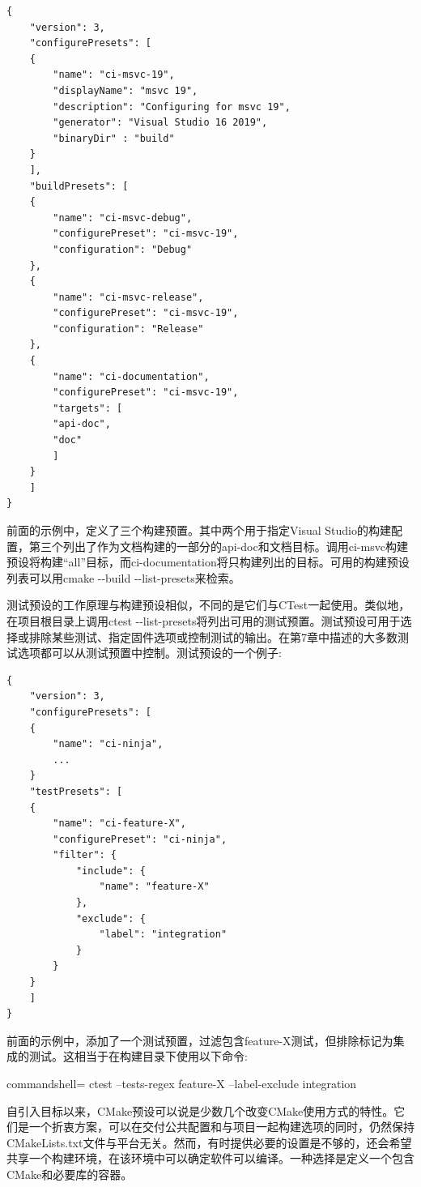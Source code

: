 \begin{lstlisting}[style=styleCMake]
{
	"version": 3,
	"configurePresets": [
	{
		"name": "ci-msvc-19",
		"displayName": "msvc 19",
		"description": "Configuring for msvc 19",
		"generator": "Visual Studio 16 2019",
		"binaryDir" : "build"
	}
	],
	"buildPresets": [
	{
		"name": "ci-msvc-debug",
		"configurePreset": "ci-msvc-19",
		"configuration": "Debug"
	},
	{
		"name": "ci-msvc-release",
		"configurePreset": "ci-msvc-19",
		"configuration": "Release"
	},
	{
		"name": "ci-documentation",
		"configurePreset": "ci-msvc-19",
		"targets": [
		"api-doc",
		"doc"
		]
	}
	]
}
\end{lstlisting}

前面的示例中，定义了三个构建预置。其中两个用于指定Visual Studio的构建配置，第三个列出了作为文档构建的一部分的api-doc和文档目标。调用ci-msvc构建预设将构建“all”目标，而ci-documentation将只构建列出的目标。可用的构建预设列表可以用cmake -{}-build -{}-list-presets来检索。

测试预设的工作原理与构建预设相似，不同的是它们与CTest一起使用。类似地，在项目根目录上调用ctest -{}-list-presets将列出可用的测试预置。测试预设可用于选择或排除某些测试、指定固件选项或控制测试的输出。在第7章中描述的大多数测试选项都可以从测试预置中控制。测试预设的一个例子:

\begin{lstlisting}[style=styleCMake]
{
	"version": 3,
	"configurePresets": [
	{
		"name": "ci-ninja",
		...
	}
	"testPresets": [
	{
		"name": "ci-feature-X",
		"configurePreset": "ci-ninja",
		"filter": {
			"include": {
				"name": "feature-X"
			},
			"exclude": {
				"label": "integration"
			}
		}
	}
	]
}
\end{lstlisting}

前面的示例中，添加了一个测试预置，过滤包含feature-X测试，但排除标记为集成的测试。这相当于在构建目录下使用以下命令:

\begin{tcblisting}{commandshell={}}
ctest --tests-regex feature-X --label-exclude integration
\end{tcblisting}

自引入目标以来，CMake预设可以说是少数几个改变CMake使用方式的特性。它们是一个折衷方案，可以在交付公共配置和与项目一起构建选项的同时，仍然保持CMakeLists.txt文件与平台无关。然而，有时提供必要的设置是不够的，还会希望共享一个构建环境，在该环境中可以确定软件可以编译。一种选择是定义一个包含CMake和必要库的容器。















